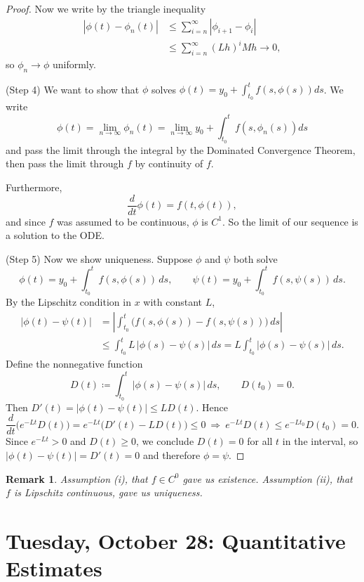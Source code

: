 \documentclass{tufte-handout}
\newtheorem{rmk}[thm]{Remark}
\theoremstyle{definition}
\begin{document}
\begin{proof}
	Now we write by the triangle inequality
	\begin{align*}
		\left| \phi(t) - \phi_n(t) \right| &\le \sum\limits_{i = n}^{\infty} \left| \phi_{i+1} - \phi_i \right| \\
										   &\le \sum\limits_{i=n}^{\infty} \left( Lh \right)^{i} Mh \to 0 
	,\end{align*} so $\phi_n \to \phi$ uniformly. 

	(Step 4) We want to show that $\phi$ solves $\phi(t) = y_0 + \int_{t_0}^{t} f(s,\phi(s))ds $. We write \[
		\phi(t) = \lim\limits_{n \to \infty} \phi_n(t) = \lim\limits_{n \to \infty} y_0 + \int_{t_0}^{t} f(s,\phi_n(s))ds 
	\] and pass the limit through the integral by the Dominated Convergence Theorem, then pass the limit through $f$ by continuity of $f$.

	Furthermore, \[
		\frac{d}{dt}\phi(t) = f(t,\phi(t))
	,\] and since $f$ was assumed to be continuous, $\phi$ is $C^1$. So the limit of our sequence is a solution to the ODE.

	
	(Step 5) Now we show uniqueness. Suppose $\phi$ and $\psi$ both solve
	\[
	\phi(t)=y_0+\int_{t_0}^{t} f(s,\phi(s))\,ds,
	\qquad
	\psi(t)=y_0+\int_{t_0}^{t} f(s,\psi(s))\,ds .
	\]
	By the Lipschitz condition in $x$ with constant $L$,
	\begin{align*}
	|\phi(t)-\psi(t)|
	&= \left|\int_{t_0}^{t}\!\big(f(s,\phi(s))-f(s,\psi(s))\big)\,ds\right| \\
	&\le \int_{t_0}^{t} L\,|\phi(s)-\psi(s)|\,ds
	= L\int_{t_0}^{t} |\phi(s)-\psi(s)|\,ds .
	\end{align*}
	Define the nonnegative function
	\[
	D(t)\coloneqq\int_{t_0}^{t} |\phi(s)-\psi(s)|\,ds ,
	\qquad D(t_0)=0.
	\]
	Then $D'(t)=|\phi(t)-\psi(t)|\le L D(t)$. Hence
	\[
	\frac{d}{dt}\!\big(e^{-Lt}D(t)\big)
	= e^{-Lt}\big(D'(t)-L D(t)\big)\le 0
	\ \Rightarrow\
	e^{-Lt}D(t)\le e^{-Lt_0}D(t_0)=0 .
	\]
	Since $e^{-Lt}>0$ and $D(t)\ge 0$, we conclude $D(t)=0$ for all $t$ in the interval, so
	$|\phi(t)-\psi(t)|=D'(t)=0$ and therefore $\phi=\psi$.
\end{proof}

\begin{rmk}
	Assumption (i), that $f \in C^0$ gave us existence. Assumption (ii), that $f$ is Lipschitz continuous, gave us uniqueness.
\end{rmk}

\section{Tuesday, October 28: Quantitative Estimates}
\end{document}
